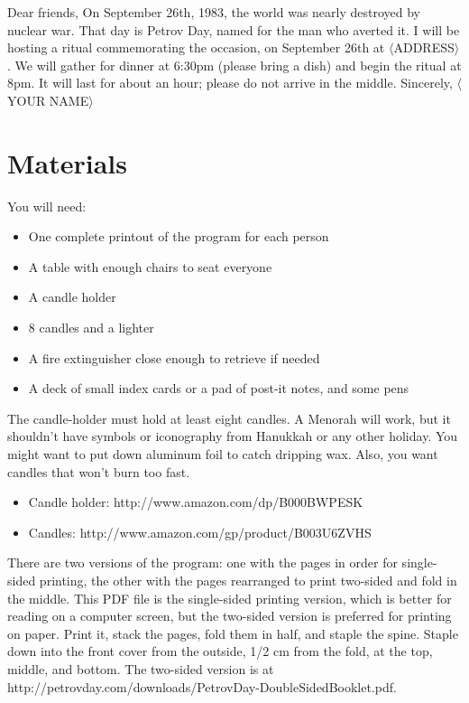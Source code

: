 \documentclass{article}
\begin{document}
\begin{center}
	\parbox{4.5in}{
	Dear friends,\newline
	On September 26th, 1983, the world was nearly destroyed by nuclear war.
	That day is Petrov Day, named for the man who averted it. I will be hosting
	a ritual commemorating the occasion, on September 26th at $\langle$ADDRESS$\rangle$. We
	will gather for dinner at 6:30pm (please bring a dish) and begin the ritual
	at 8pm. It will last for about an hour; please do not arrive in the middle.\newline
	Sincerely,\newline
	$\langle$YOUR NAME$\rangle$}
\end{center}

\section{Materials}
You will need:

\begin{itemize} \itemsep0pt \parskip0pt 
	\item One complete printout of the program for each person
	\item A table with enough chairs to seat everyone
	\item A candle holder
	\item 8 candles and a lighter
	\item A fire extinguisher close enough to retrieve if needed
	\item A deck of small index cards or a pad of post-it notes, and some pens
\end{itemize}

The candle-holder must hold at least eight candles. A Menorah will work, but it
shouldn't have symbols or iconography from Hanukkah or any other holiday. You
might want to put down aluminum foil to catch dripping wax. Also, you want
candles that won't burn too fast.

\begin{itemize} \itemsep0pt \parskip0pt 
	\item Candle holder: http://www.amazon.com/dp/B000BWPESK
	\item Candles: http://www.amazon.com/gp/product/B003U6ZVHS
\end{itemize}

There are two versions of the program: one with the pages in order for
single-sided printing, the other with the pages rearranged to print two-sided
and fold in the middle. This PDF file is the single-sided printing version,
which is better for reading on a computer screen, but the two-sided version is
preferred for printing on paper. Print it, stack the pages, fold them in half,
and staple the spine. Staple down into the front cover from the outside, 1/2
cm from the fold, at the top, middle, and bottom. The two-sided version is at
http://petrovday.com/downloads/PetrovDay-DoubleSidedBooklet.pdf{}.
\end{document}
